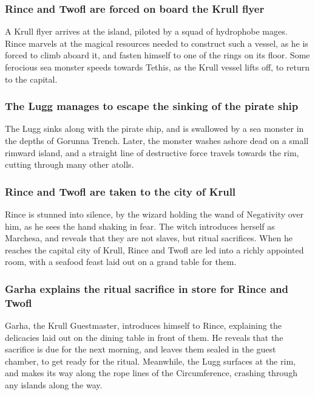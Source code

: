 \subsubsection{\Gls{Rince} and \Gls{Twofl} are forced on board the Krull flyer}
A Krull flyer arrives at the island, piloted by a squad of hydrophobe mages. \Gls{Rince} marvels
at the magical resources needed to construct such a vessel, as he is forced to climb aboard it, and
fasten himself to one of the rings on its floor. Some ferocious sea monster speeds towards
\Gls{Tethis}, as the Krull vessel lifts off, to return to the capital.

\subsubsection{The \Gls{Lugg} manages to escape the sinking of the pirate ship}
The \Gls{Lugg} sinks along with the pirate ship, and is swallowed by a sea monster in the depths of
Gorunna Trench. Later, the monster washes ashore dead on a small rimward island, and a straight line
of destructive force travels towards the rim, cutting through many other atolls.

\subsubsection{\Gls{Rince} and \Gls{Twofl} are taken to the city of Krull}
\Gls{Rince} is stunned into silence, by the wizard holding the wand of Negativity over him, as he
sees the hand shaking in fear. The witch introduces herself as \Gls{Marchesa}, and reveals that they
are not slaves, but ritual sacrifices. When he reaches the capital city of Krull, \Gls{Rince}
and \Gls{Twofl} are led into a richly appointed room, with a seafood feast laid out on a grand table
for them.

\subsubsection{\Gls{Garha} explains the ritual sacrifice in store for \Gls{Rince} and \Gls{Twofl}}
\Gls{Garha}, the Krull Guestmaster, introduces himself to \Gls{Rince}, explaining the delicacies
laid out on the dining table in front of them. He reveals that the sacrifice is due for the next
morning, and leaves them sealed in the guest chamber, to get ready for the ritual. Meanwhile,
the \Gls{Lugg} surfaces at the rim, and makes its way along the rope lines of the Circumference,
crashing through any islands along the way.

